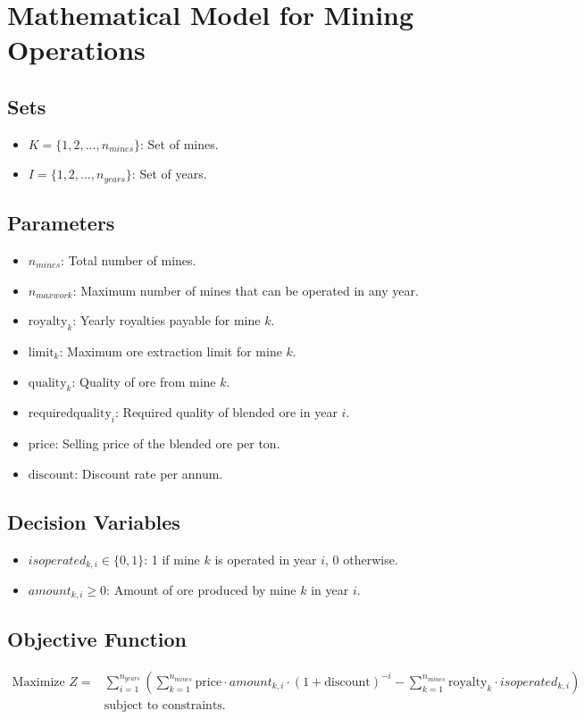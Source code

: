 \documentclass{article}
\begin{document}
\section*{Mathematical Model for Mining Operations}

\subsection*{Sets}
\begin{itemize}
    \item $K = \{1, 2, \ldots, n_{mines}\}$: Set of mines.
    \item $I = \{1, 2, \ldots, n_{years}\}$: Set of years.
\end{itemize}

\subsection*{Parameters}
\begin{itemize}
    \item $n_{mines}$: Total number of mines.
    \item $n_{maxwork}$: Maximum number of mines that can be operated in any year.
    \item $\text{royalty}_{k}$: Yearly royalties payable for mine $k$.
    \item $\text{limit}_{k}$: Maximum ore extraction limit for mine $k$.
    \item $\text{quality}_{k}$: Quality of ore from mine $k$.
    \item $\text{requiredquality}_{i}$: Required quality of blended ore in year $i$.
    \item $\text{price}$: Selling price of the blended ore per ton.
    \item $\text{discount}$: Discount rate per annum.
\end{itemize}

\subsection*{Decision Variables}
\begin{itemize}
    \item $isoperated_{k,i} \in \{0, 1\}$: 1 if mine $k$ is operated in year $i$, 0 otherwise.
    \item $amount_{k,i} \geq 0$: Amount of ore produced by mine $k$ in year $i$.
\end{itemize}

\subsection*{Objective Function}
\begin{align*}
\text{Maximize } Z = & \sum_{i=1}^{n_{years}} \left( \sum_{k=1}^{n_{mines}} \text{price} \cdot amount_{k,i} \cdot (1 + \text{discount})^{-i} - \sum_{k=1}^{n_{mines}} \text{royalty}_{k} \cdot isoperated_{k,i} \right) \\
& \text{subject to } \text{constraints.}
\end{align*}
\end{document}

